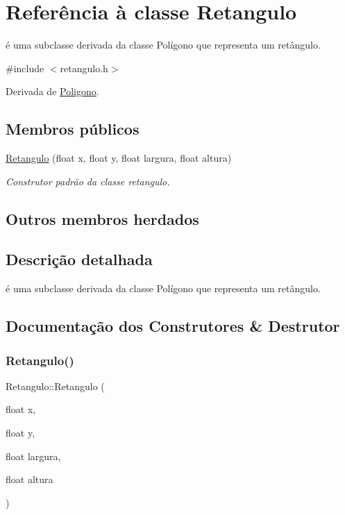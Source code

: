 \hypertarget{class_retangulo}{}\section{Referência à classe Retangulo}
\label{class_retangulo}


é uma subclasse derivada da classe Polígono que representa um retângulo.  




{\ttfamily \#include $<$retangulo.\+h$>$}



Derivada de \mbox{\hyperlink{class_poligono}{Poligono}}.

\subsection*{Membros públicos}
\begin{DoxyCompactItemize}
\item 
\mbox{\hyperlink{class_retangulo_acca1dd211eefc8dc04658c943c0d1122}{Retangulo}} (float x, float y, float largura, float altura)
\begin{DoxyCompactList}\small\item\em Construtor padrão da classe retangulo. \end{DoxyCompactList}\end{DoxyCompactItemize}
\subsection*{Outros membros herdados}


\subsection{Descrição detalhada}
é uma subclasse derivada da classe Polígono que representa um retângulo. 

\subsection{Documentação dos Construtores \& Destrutor}
\mbox{\label{class_retangulo_acca1dd211eefc8dc04658c943c0d1122}} 
\subsubsection{\texorpdfstring{Retangulo()}{Retangulo()}}
{\footnotesize\ttfamily Retangulo\+::\+Retangulo (\begin{DoxyParamCaption}\item[{float}]{x,  }\item[{float}]{y,  }\item[{float}]{largura,  }\item[{float}]{altura }\end{DoxyParamCaption})}



